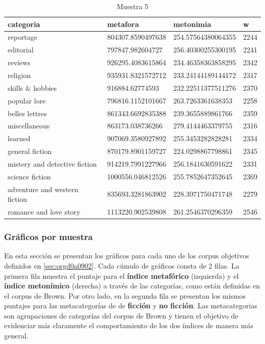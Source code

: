 \documentclass[12pt,letterpaper,twoside]{article}
\begin{document}
\begin{center}
\begin{longtable}{| p{} | p{} | p{}|p{}|}
\caption{Muestra 5}
    \hline
        categoria & metafora & metonimia & w \\ \hline
        reportage & 804307.8590497638 & 254.57564380064355 & 2244 \\ \hline
        editorial & 797847.982604727 & 256.40300255300195 & 2241 \\ \hline
        reviews & 926295.4083615864 & 234.46358363858295 & 2342 \\ \hline
        religion & 935931.8321572712 & 233.24144189144172 & 2317 \\ \hline
        skills \& hobbies & 916884.62774593 & 232.22511377511276 & 2370 \\ \hline
        popular lore & 796816.1152101667 & 263.7263361638353 & 2258 \\ \hline
        belles lettres & 861343.6692835388 & 239.3655889861766 & 2359 \\ \hline
        miscellaneous & 863173.038736266 & 279.4144463379755 & 2316 \\ \hline
        learned & 907069.3580927892 & 255.3453282828281 & 2334 \\ \hline
        general fiction & 870179.8901159727 & 224.0298867798861 & 2345 \\ \hline
        mistery and detective fiction & 914219.7991227966 & 256.1841630591622 & 2331 \\ \hline
        science fiction & 1000556.046812526 & 255.7852647352645 & 2369 \\ \hline
        adventure and western fiction & 835693.3281863902 & 228.3971750471748 & 2279 \\ \hline
        romance and love story & 1113220.902539808 & 261.2546370296359 & 2546 \\ \hline
\end{longtable}
    \label{muestra5}
\end{center}
\subsubsection{Gráficos por muestra}
\label{sec:org094ed12}
En esta sección se presentan los gráficos para cada uno de los corpus objetivos
definidos en \ref{sec:orgd0a0902}. Cada cúmulo de gráficos consta de 2 filas.
La primera fila muestra el puntaje para el \textbf{índice metafórico} (izquierda) y
el \textbf{índice metonímico} (derecha) a través de las categorías, como están
definidas en el corpus de Brown. Por otro lado, en la segunda fila
se presentan los mismos puntajes para las metacategorías de de \textbf{ficción}
y \textbf{no ficción}. Las metacategorias son agrupaciones de categorías del corpus
de Brown y tienen el objetivo de evidenciar más claramente el comportamiento
de los dos índices de manera más general.
\end{document}
